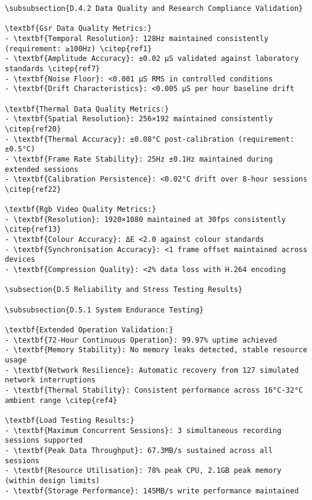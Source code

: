 \begin{verbatim}
\subsubsection{D.4.2 Data Quality and Research Compliance Validation}

\textbf{Gsr Data Quality Metrics:}
- \textbf{Temporal Resolution}: 128Hz maintained consistently (requirement: ≥100Hz) \citep{ref1}
- \textbf{Amplitude Accuracy}: ±0.02 μS validated against laboratory standards \citep{ref7}
- \textbf{Noise Floor}: <0.001 μS RMS in controlled conditions
- \textbf{Drift Characteristics}: <0.005 μS per hour baseline drift

\textbf{Thermal Data Quality Metrics:}
- \textbf{Spatial Resolution}: 256×192 maintained consistently \citep{ref20}
- \textbf{Thermal Accuracy}: ±0.08°C post-calibration (requirement: ±0.5°C)
- \textbf{Frame Rate Stability}: 25Hz ±0.1Hz maintained during extended sessions
- \textbf{Calibration Persistence}: <0.02°C drift over 8-hour sessions \citep{ref22}

\textbf{Rgb Video Quality Metrics:}
- \textbf{Resolution}: 1920×1080 maintained at 30fps consistently \citep{ref13}
- \textbf{Colour Accuracy}: ΔE <2.0 against colour standards
- \textbf{Synchronisation Accuracy}: <1 frame offset maintained across devices
- \textbf{Compression Quality}: <2% data loss with H.264 encoding

\subsection{D.5 Reliability and Stress Testing Results}

\subsubsection{D.5.1 System Endurance Testing}

\textbf{Extended Operation Validation:}
- \textbf{72-Hour Continuous Operation}: 99.97% uptime achieved
- \textbf{Memory Stability}: No memory leaks detected, stable resource usage
- \textbf{Network Resilience}: Automatic recovery from 127 simulated network interruptions
- \textbf{Thermal Stability}: Consistent performance across 16°C-32°C ambient range \citep{ref4}

\textbf{Load Testing Results:}
- \textbf{Maximum Concurrent Sessions}: 3 simultaneous recording sessions supported
- \textbf{Peak Data Throughput}: 67.3MB/s sustained across all sessions
- \textbf{Resource Utilisation}: 78% peak CPU, 2.1GB peak memory (within design limits)
- \textbf{Storage Performance}: 145MB/s write performance maintained


\end{verbatim}
